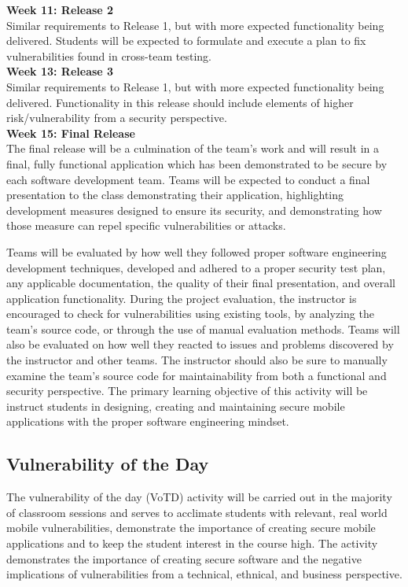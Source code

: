 \documentclass[conference]{IEEEtran}
\begin{document}
\textbf{Week 11: Release 2}\\
Similar requirements to Release 1, but with more expected functionality being delivered. Students will be expected to formulate and execute a plan to fix vulnerabilities found in cross-team testing. \\

\textbf{Week 13: Release 3}\\
Similar requirements to Release 1, but with more expected functionality being delivered. Functionality in this release should include elements of higher risk/vulnerability from a security perspective.\\

\textbf{Week 15: Final Release}\\
The final release will be a culmination of the team's work and will result in a final, fully functional application which has been demonstrated to be secure by each software development team. Teams will be expected to conduct a final presentation to the class demonstrating their application, highlighting development measures designed to ensure its security, and demonstrating how those measure can repel specific vulnerabilities or attacks.

Teams will be evaluated by how well they followed proper software engineering development techniques, developed and adhered to a proper security test plan, any applicable documentation, the quality of their final presentation, and overall application functionality. During the project evaluation, the instructor is encouraged to check for vulnerabilities using existing tools, by analyzing the team's source code, or through the use of manual evaluation methods. Teams will also be evaluated on how well they reacted to issues and problems discovered by the instructor and other teams. The instructor should also be sure to manually examine the team's source code for maintainability from both a functional and security perspective. The primary learning objective of this activity will be instruct students in designing, creating and maintaining secure mobile applications with the proper software engineering mindset.

\subsection{Vulnerability of the Day}

The vulnerability of the day (VoTD) activity will be carried out in the majority of classroom sessions and serves to acclimate students with relevant, real world mobile vulnerabilities, demonstrate the importance of creating secure mobile applications and to keep the student interest in the course high. The activity demonstrates the importance of creating secure software and the negative implications of vulnerabilities from a technical, ethnical, and business perspective.
\end{document}
